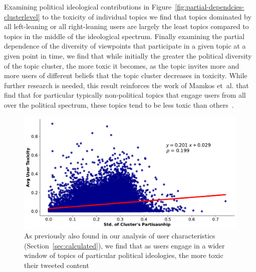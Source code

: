Examining political ideological contributions in Figure~\ref{fig:partial-dependcies-clusterlevel}  to the toxicity of individual topics we find that topics dominated by all left-leaning or all right-leaning users are largely the least topics compared to topics in the middle of the ideological spectrum. Finally examining the partial dependence of the diversity of viewpoints that participate in a given topic at a given point in time, we find that while initially the greater the political diversity of the topic cluster, the more toxic it becomes, as the topic invites more and more users of different beliefs that the topic cluster decreases in toxicity. While further research is needed, this result reinforces the work of Mamkos et~al. that find that for particular typically non-political topics that engage users from all over the political spectrum, these topics tend to be less toxic than others~\cite{mamakos2023social}.

 \begin{figure}
\begin{minipage}[l]{0.6\textwidth}
\includegraphics[width=1\columnwidth]{figures/cluster_user_ideology_vs_user_toxicity-20240429.pdf} 
\end{minipage}
\begin{minipage}[l]{0.33\textwidth}
\caption{As previously also found in our analysis of user characteristics (Section~\ref{sec:calculated}), we find that as users engage in a wider window of topics of particular political ideologies, the more toxic their tweeted content\label{fig:toxicity-vs-var-user}}
\end{minipage}

\end{figure}


